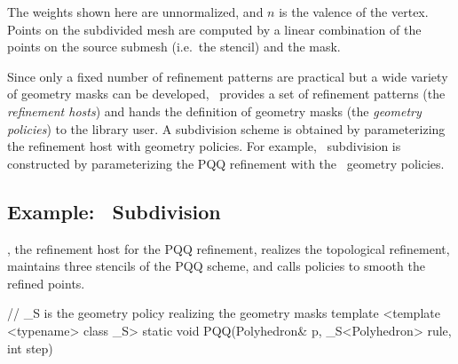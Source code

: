 
The weights shown here are unnormalized, and $n$ is the valence 
of the vertex. 
Points on the subdivided mesh are computed by a linear combination
of the points on the source submesh (i.e.~the stencil) and the mask.

Since only a fixed number of refinement patterns are 
practical but a wide variety of geometry masks can be developed,
\ provides a set of refinement patterns (the \emph{refinement hosts})
and hands the definition of geometry masks
(the \emph{geometry policies}) to the library user.
A subdivision scheme is obtained by parameterizing the 
refinement host with geometry policies. 
For example, \CC\ subdivision is constructed by 
parameterizing the PQQ refinement with the \CC\ geometry 
policies.



\subsection{Example: \CC\ Subdivision}
, the refinement 
host for the PQQ refinement, realizes the topological 
refinement, maintains three stencils of the 
PQQ scheme, and calls policies to smooth the refined points.

\begin{ccExampleCode}
  // _S is the geometry policy realizing the geometry masks
  template <template <typename> class _S>
  static void PQQ(Polyhedron& p, _S<Polyhedron> rule, int step)
\end{ccExampleCode}

